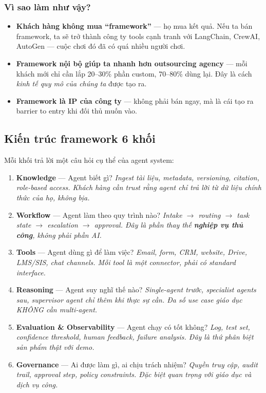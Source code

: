\documentclass[11pt,a4paper]{article}
\begin{document}
\subsubsection*{Vì sao làm như vậy?}

\begin{itemize}
\item \textbf{Khách hàng không mua ``framework''} — họ mua kết quả. Nếu ta bán
framework, ta sẽ trở thành công ty tools cạnh tranh với LangChain, CrewAI,
AutoGen — cuộc chơi đó đã có quá nhiều người chơi.

\item \textbf{Framework nội bộ giúp ta nhanh hơn outsourcing agency} — mỗi khách
mới chỉ cần lắp 20--30\% phần custom, 70--80\% dùng lại. Đây là cách \textit{kinh
tế quy mô của chúng ta} được tạo ra.

\item \textbf{Framework là IP của công ty} — không phải bán ngay, mà là cái tạo ra
barrier to entry khi đối thủ muốn vào.
\end{itemize}

\subsection{Kiến trúc framework 6 khối}

Mỗi khối trả lời một câu hỏi cụ thể của agent system:

\begin{enumerate}
\item \textbf{Knowledge} — Agent biết gì? \textit{Ingest tài liệu, metadata,
versioning, citation, role-based access. Khách hàng cần trust rằng agent chỉ trả
lời từ dữ liệu chính thức của họ, không bịa.}

\item \textbf{Workflow} — Agent làm theo quy trình nào? \textit{Intake $\to$
routing $\to$ task state $\to$ escalation $\to$ approval. Đây là phần thay thế
\textbf{nghiệp vụ thủ công}, không phải phần AI.}

\item \textbf{Tools} — Agent dùng gì để làm việc? \textit{Email, form, CRM,
website, Drive, LMS/SIS, chat channels. Mỗi tool là một connector, phải có
standard interface.}

\item \textbf{Reasoning} — Agent suy nghĩ thế nào? \textit{Single-agent trước,
specialist agents sau, supervisor agent chỉ thêm khi thực sự cần. Đa số use case
giáo dục KHÔNG cần multi-agent.}

\item \textbf{Evaluation \& Observability} — Agent chạy có tốt không? \textit{
Log, test set, confidence threshold, human feedback, failure analysis. Đây là
thứ phân biệt sản phẩm thật với demo.}

\item \textbf{Governance} — Ai được làm gì, ai chịu trách nhiệm? \textit{Quyền
truy cập, audit trail, approval step, policy constraints. Đặc biệt quan trọng
với giáo dục và dịch vụ công.}
\end{enumerate}
\end{document}
